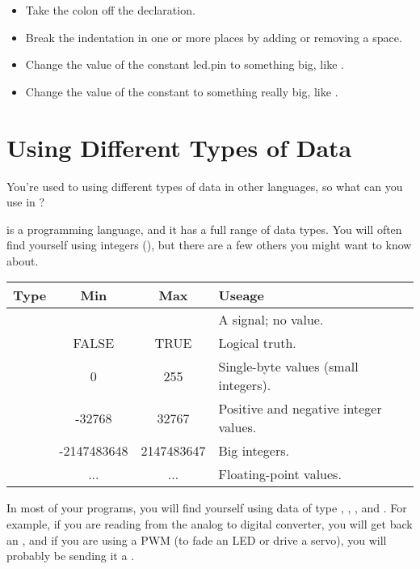 \makingthingsbreak

\begin{itemize}
	\item Take the colon off the \VALINT declaration. 
	\item Break the indentation in one or more places by adding or removing a space.
	\item Change the value of the constant {\constant led.pin} to something big, like {}.
	\item Change the value of the constant {} to something really big, like {}.
\end{itemize}

\seealso

\XXX

% 

\section{Using Different Types of Data}

\problem
You're used to using different types of data in other languages, so what can you use in \occam?


\solution
\occam is a programming language, and it has a full range of data types. You will often find yourself using integers (\INT), but there are a few others you might want to know about.


	\begin{tabular}{l|c|c|p{1in}}
		\hline
		Type & Min & Max & Useage \\
		\hline
		\SIGNALT & & & A signal; no value. \\
		\BOOL & FALSE & TRUE & Logical truth. \\
		\BYTE & 0 & 255 & Single-byte values (small integers). \\
		\INT & -32768 & 32767 & Positive and negative integer values. \\
		\INTTT &  -2147483648 & 2147483647 & Big integers. \\
		\REALTT & ... & ... & Floating-point values. \\
		\hline
	\end{tabular}

\discussion
In most of your programs, you will find yourself using data of type \SIGNALT, \BOOL, \BYTE, and \INT. For example, if you are reading from the analog to digital converter, you will get back an \INT, and if you are using a PWM \PROC (to fade an LED or drive a servo), you will probably be sending it a \BYTE. 

